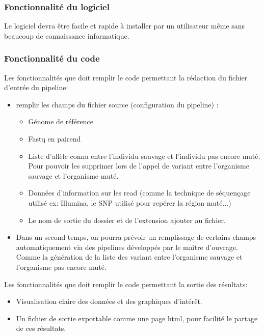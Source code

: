\documentclass[12pt]{article}
\begin{document}
\subsubsection{Fonctionnalité du logiciel}

Le logiciel devra être facile et rapide à installer par un utilisateur même sans beaucoup de connaissance informatique. 

\subsubsection{Fonctionnalité du code}

Les fonctionnalités que doit remplir le code permettant la rédaction du fichier d'entrée du pipeline:

\begin{itemize}
\item remplir les champs du fichier source (configuration du pipeline) :
\begin{itemize}
\item Génome de référence
\item Fastq en pairend 
\item Liste d'allèle connu entre l'individu sauvage et l’individu pas encore muté. Pour pouvoir les supprimer lors de l'appel de variant entre l'organisme sauvage et l'organisme muté. 
\item Données d'information sur les read (comme la technique de séquençage utilisé ex: Illumina, le SNP utilisé pour repérer la région muté...)
\item Le nom de sortie du dossier et de l’extension ajouter au fichier.
\end{itemize}
\item Dans un second temps, on pourra prévoir un remplissage de certains champs automatiquement via des pipelines développés par le maître d'ouvrage. Comme la génération de la liste des variant entre l'organisme sauvage et l'organisme pas encore muté.
\end{itemize}

Les fonctionnalités que doit remplir le code permettant la sortie des résultats: 

\begin{itemize}
\item Visualisation claire des données et des graphiques d’intérêt.
\item Un fichier de sortie exportable comme une page html, pour facilité le partage de ces résultats. 
\end{itemize}
\end{document}
